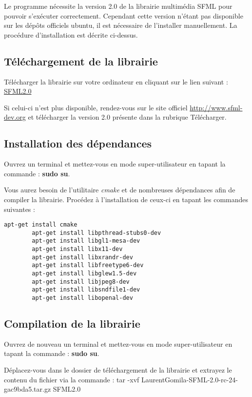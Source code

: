 
	Le programme nécessite la version 2.0 de la librairie multimédia SFML pour pouvoir s'exécuter correctement. Cependant cette version n'étant pas disponible sur les dépôts officiels ubuntu, il est nécessaire de l'installer manuellement. La procédure d'installation est décrite ci-dessus.
	
\subsection{Téléchargement de la librairie}

Télécharger la librairie sur votre ordinateur en cliquant sur le lien suivant :
\href{https://github.com/LaurentGomila/SFML/tarball/master}{SFML2.0}


Si celui-ci n'est plus disponible, rendez-vous sur le site officiel \href{http://www.sfml-dev.org}{http://www.sfml-dev.org} et télécharger la version 2.0 présente dans la rubrique Télécharger.

\subsection{Installation des dépendances}

Ouvrez un terminal et mettez-vous en mode super-utilisateur en tapant la commande : \textbf{sudo su}.

Vous aurez besoin de l'utilitaire \textit{cmake} et de nombreuses dépendances afin de compiler la librairie. Procédez à l'installation de ceux-ci en tapant les commandes suivantes :
\begin{center}
	\begin{lstlisting}[caption={Installation des dépendances}]
		apt-get install cmake
		apt-get install libpthread-stubs0-dev
		apt-get install libgl1-mesa-dev
		apt-get install libx11-dev
		apt-get install libxrandr-dev
		apt-get install libfreetype6-dev
		apt-get install libglew1.5-dev
		apt-get install libjpeg8-dev
		apt-get install libsndfile1-dev
		apt-get install libopenal-dev
	\end{lstlisting}
\end{center}


\subsection{Compilation de la librairie}

Ouvrez de nouveau un terminal et mettez-vous en mode super-utilisateur en tapant la commande : \textbf{sudo su}.

Déplacez-vous dans le dossier de téléchargement de la librairie et extrayez le contenu du fichier via la commande : tar -xvf LaurentGomila-SFML-2.0-rc-24-gac9bda5.tar.gz SFML2.0

